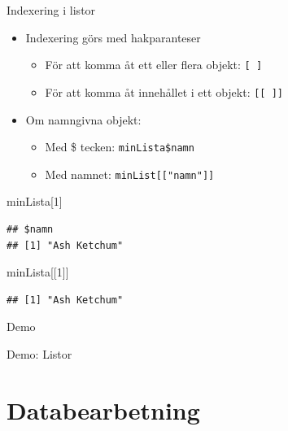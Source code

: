 \documentclass[
  11pt,
  ignorenonframetext,
]{beamer}
\newenvironment{Shaded}{\begin{snugshade}}{\end{snugshade}}
\newcommand{\DecValTok}[1]{\textcolor[rgb]{0.00,0.00,0.81}{#1}}
\newcommand{\NormalTok}[1]{#1}
\providecommand{\tightlist}{%
  \setlength{\itemsep}{0pt}\setlength{\parskip}{0pt}}
\begin{document}
\begin{frame}[fragile]{Indexering i listor}
\label{indexering-i-listor}
\begin{itemize}
\tightlist
\item
  Indexering görs med hakparanteser

  \begin{itemize}
  \tightlist
  \item
    För att komma åt ett eller flera objekt: \texttt{[ ]}
  \item
    För att komma åt innehållet i ett objekt: \texttt{[[ ]]}
  \end{itemize}
\item
  Om namngivna objekt:

  \begin{itemize}
  \tightlist
  \item
    Med \$ tecken: \texttt{minLista\$namn}
  \item
    Med namnet: \texttt{minList[["namn"]]}
  \end{itemize}
\end{itemize}

\begin{Shaded}
\begin{Highlighting}[]
\NormalTok{minLista[}\DecValTok{1}\NormalTok{]}
\end{Highlighting}
\end{Shaded}

\begin{verbatim}
## $namn
## [1] "Ash Ketchum"
\end{verbatim}

\begin{Shaded}
\begin{Highlighting}[]
\NormalTok{minLista[[}\DecValTok{1}\NormalTok{]]}
\end{Highlighting}
\end{Shaded}

\begin{verbatim}
## [1] "Ash Ketchum"
\end{verbatim}
\end{frame}

\begin{frame}{Demo}
\label{demo-2}
\begin{block}{Demo: Listor}
\label{demo-listor}
\end{block}
\end{frame}

\section{Databearbetning}\label{databearbetning}
\end{document}
